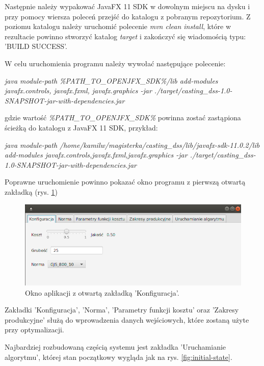 Następnie należy wypakować JavaFX 11 SDK w dowolnym miejscu na dysku i przy pomocy wiersza poleceń przejść do katalogu z pobranym repozytorium. Z poziomu katalogu należy uruchomić polecenie \textit{mvn clean install}, które w rezultacie powinno stworzyć katalog \textit{target} i zakończyć się wiadomością typu: 'BUILD SUCCESS'.

W celu uruchomienia programu należy wywołać następujące polecenie:

\textit{java \-\-module-path \%PATH\_TO\_OPENJFX\_SDK\%/lib \-\-add-modules javafx.controls, javafx.fxml, javafx.graphics -jar ./target/casting\_dss-1.0-SNAPSHOT-jar-with-dependencies.jar}

gdzie wartość \textit{\%PATH\_TO\_OPENJFX\_SDK\%} powinna zostać zastąpiona ścieżką do katalogu z JavaFX 11 SDK, przykład:

\textit{java \-\-module-path /home/kamilw/magisterka/casting\_dss/lib/javafx-sdk-11.0.2/lib \-\-add-modules javafx.controls,javafx.fxml,javafx.graphics -jar ./target/casting\_dss-1.0-SNAPSHOT-jar-with-dependencies.jar}

Poprawne uruchomienie powinno pokazać okno programu z pierwszą otwartą zakładką (rys. \ref{fig:okno1})


\begin{figure}[ht]{}
	\centering
	\includegraphics[scale=0.8]{images/okno1.png}
	\caption {
		 Okno aplikacji z otwartą zakładką 'Konfiguracja'.
	}
	\label{fig:okno1}
\end{figure}

Zakładki 'Konfiguracja', 'Norma', 'Parametry funkcji kosztu' oraz 'Zakresy produkcyjne' służą do wprowadzenia danych wejściowych, które zostaną użyte przy optymalizacji.

Najbardziej rozbudowaną częścią systemu jest zakładka 'Uruchamianie algorytmu', której stan początkowy wygląda jak na rys. \ref{fig:initial-state}.

